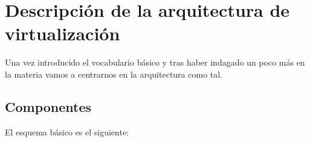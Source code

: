 \chapter{Descripción de la arquitectura de virtualización}

\lettrine[lines=1,slope=4pt,findent=0pt]{U}{}na vez introducido el vocabulario básico y tras haber indagado un poco más en la materia vamos a centrarnos en la arquitectura como tal.

\section{Componentes}

El esquema básico es el siguiente:

\begin{center}
\end{center}